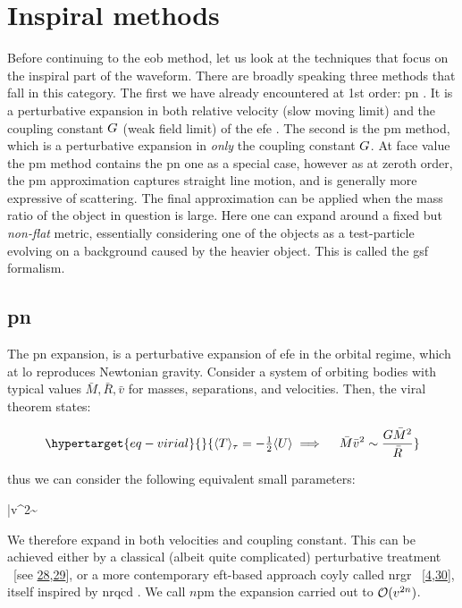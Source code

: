 \documentclass[
  11pt,
  a4paper,
  DIV=11,
  numbers=noendperiod,
  twoside]{scrreprt}
\let\[\relax \let\]\relax %
\DeclareRobustCommand{\[}{\begin{equation}}
\DeclareRobustCommand{\]}{\end{equation}}
\begin{document}
\hypertarget{inspiral-methods}{%
\section{Inspiral methods}\label{inspiral-methods}}

Before continuing to the \gls{eob} method, let us look at the techniques
that focus on the inspiral part of the waveform. There are broadly
speaking three methods that fall in this category. The first we have
already encountered at 1st order: \gls{pn} . It is a perturbative
expansion in both relative velocity (slow moving limit) and the coupling
constant \(\grav\) (weak field limit) of the \gls{efe} . The second is
the \gls{pm} method, which is a perturbative expansion in \emph{only}
the coupling constant \(\grav\). At face value the \gls{pm} method
contains the \gls{pn} one as a special case, however as at zeroth order,
the \gls{pm} approximation captures straight line motion, and is
generally more expressive of scattering. The final approximation can be
applied when the mass ratio of the object in question is large. Here one
can expand around a fixed but \emph{non-flat} metric, essentially
considering one of the objects as a test-particle evolving on a
background caused by the heavier object. This is called the \gls{gsf}
formalism.

\hypertarget{pn}{%
\subsection{\texorpdfstring{\acrlong{pn}}{}}\label{pn}}

The \acrfull{pn} expansion, is a perturbative expansion of \gls{efe} in
the orbital regime, which at \gls{lo} reproduces Newtonian gravity.
Consider a system of orbiting bodies with typical values
\(\bar{M},\bar{R},\bar{v}\) for masses, separations, and velocities.
Then, the viral theorem states:

\begin{equation}\protect\hypertarget{eq-virial}{}{
\ang{T}_\tau=-\half \ang{U} \implies \quad \bar{M} \bar{v}^2\sim \frac{G \bar{M}^2}{\bar{R}}
}\label{eq-virial}\end{equation}

thus we can consider the following equivalent small parameters:

\[
\bar{v}^2\sim {}
\]

We therefore expand in both velocities and coupling constant. This can
be achieved either by a classical (albeit quite complicated)
perturbative treatment ~{[}see
\protect\hyperlink{ref-Blanchet:2013haa}{28},\protect\hyperlink{ref-Blanchet:1995fg}{29}{]},
or a more contemporary \gls{eft}-based approach coyly called \gls{nrgr}
~{[}\protect\hyperlink{ref-Goldberger:2004jt}{4},\protect\hyperlink{ref-Sturani:2021xpq}{30}{]},
itself inspired by \gls{nrqcd} . We call \(n\)\gls{pm} the expansion
carried out to \(\order[2n]{v}\).
\end{document}
